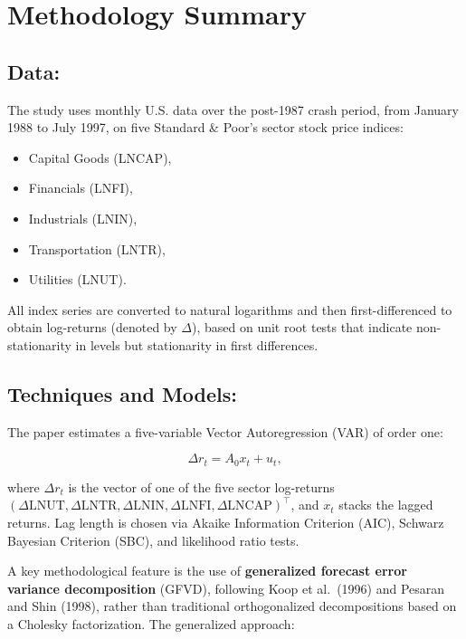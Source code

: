 \documentclass{article}
\begin{document}
\hfill

\section{Methodology Summary}

\subsection{Data:}  
The study uses monthly U.S. data over the post-1987 crash period, from January 1988 to July 1997, on five Standard \& Poor's sector stock price indices:

\begin{itemize}
    \item Capital Goods (LNCAP),
    \item Financials (LNFI),
    \item Industrials (LNIN),
    \item Transportation (LNTR),
    \item Utilities (LNUT).
\end{itemize}

\noindent All index series are converted to natural logarithms and then first-differenced to obtain log-returns (denoted by $\Delta$), based on unit root tests that indicate non-stationarity in levels but stationarity in first differences.

\subsection{Techniques and Models:}  
The paper estimates a five-variable Vector Autoregression (VAR) of order one:

\[
\Delta r_t = A_0 x_t + u_t,
\]

\noindent where $\Delta r_t$ is the vector of  one of the five sector log-returns $(\Delta \text{LNUT}, \Delta \text{LNTR}, \Delta \text{LNIN}, \Delta \text{LNFI}, \Delta \text{LNCAP})^\top$, and $x_t$ stacks the lagged returns. Lag length is chosen via Akaike Information Criterion (AIC), Schwarz Bayesian Criterion (SBC), and likelihood ratio tests.

\hfill

\noindent A key methodological feature is the use of \textbf{generalized forecast error variance decomposition} (GFVD), following Koop et al.\ (1996) and Pesaran and Shin (1998), rather than traditional orthogonalized decompositions based on a Cholesky factorization. The generalized approach:
\end{document}
